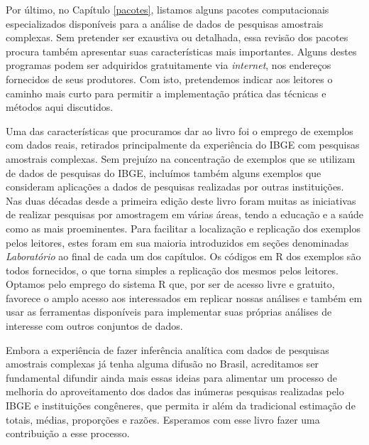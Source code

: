 \documentclass[
]{book}
\begin{document}
Por último, no Capítulo \ref{pacotes}, listamos alguns pacotes computacionais
especializados disponíveis para a análise de dados de pesquisas amostrais complexas.
Sem pretender ser exaustiva ou detalhada, essa revisão dos pacotes procura também
apresentar suas características mais importantes. Alguns destes programas podem ser
adquiridos gratuitamente via \emph{internet}, nos endereços fornecidos de seus produtores.
Com isto, pretendemos indicar aos leitores o caminho mais curto para permitir a
implementação prática das técnicas e métodos aqui discutidos.

Uma das características que procuramos dar ao livro foi o emprego de
exemplos com dados reais, retirados principalmente da experiência do
IBGE com pesquisas amostrais complexas. Sem prejuízo na concentração de exemplos
que se utilizam de dados de pesquisas do IBGE, incluímos também alguns exemplos que
consideram aplicações a dados de pesquisas realizadas por outras instituições.
Nas duas décadas desde a primeira edição deste livro foram muitas as iniciativas de
realizar pesquisas por amostragem em várias áreas, tendo a educação e a saúde como
as mais proeminentes. Para facilitar a localização e replicação dos exemplos pelos
leitores, estes foram em sua maioria introduzidos em seções denominadas \emph{Laboratório}
ao final de cada um dos capítulos. Os códigos em R dos exemplos são todos fornecidos,
o que torna simples a replicação dos mesmos pelos leitores. Optamos pelo emprego do
sistema R que, por ser de acesso livre e gratuito, favorece o amplo acesso aos
interessados em replicar nossas análises e também em usar as ferramentas disponíveis
para implementar suas próprias análises de interesse com outros conjuntos de dados.

Embora a experiência de fazer inferência analítica com dados de pesquisas amostrais
complexas já tenha alguma difusão no Brasil, acreditamos ser fundamental difundir
ainda mais essas ideias para alimentar um processo de melhoria do aproveitamento
dos dados das inúmeras pesquisas realizadas pelo IBGE e instituições congêneres, que
permita ir além da tradicional estimação de totais, médias, proporções
e razões. Esperamos com esse livro fazer uma contribuição a esse processo.
\end{document}
